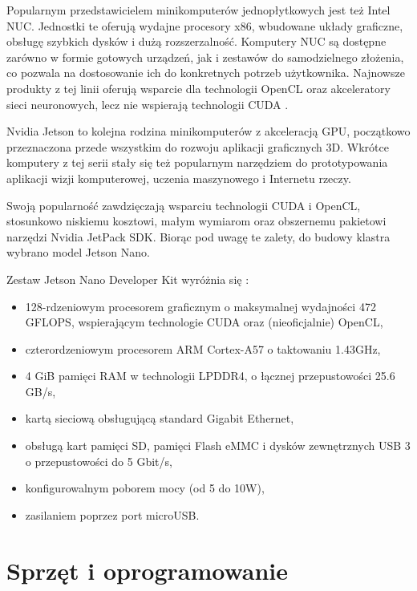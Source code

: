 Popularnym przedstawicielem minikomputerów jednopłytkowych jest też Intel NUC. Jednostki te
oferują wydajne procesory x86, wbudowane układy graficzne, obsługę szybkich dysków i dużą
rozszerzalność. Komputery NUC są dostępne zarówno w formie gotowych urządzeń, jak i zestawów
do samodzielnego złożenia, co pozwala na dostosowanie ich do konkretnych potrzeb użytkownika.
Najnowsze produkty z tej linii oferują wsparcie dla technologii OpenCL oraz akceleratory
sieci neuronowych, lecz nie wspierają technologii CUDA \cite{nuc-list}.

Nvidia Jetson to kolejna rodzina minikomputerów z akceleracją GPU, początkowo przeznaczona
przede wszystkim do rozwoju aplikacji graficznych 3D. Wkrótce komputery z tej serii stały
się też popularnym narzędziem do prototypowania aplikacji wizji komputerowej, uczenia
maszynowego i Internetu rzeczy.

Swoją popularność zawdzięczają wsparciu technologii CUDA i OpenCL, stosunkowo niskiemu
kosztowi, małym wymiarom oraz obszernemu pakietowi narzędzi Nvidia JetPack SDK.
Biorąc pod uwagę te zalety, do budowy klastra wybrano model Jetson Nano.

Zestaw Jetson Nano Developer Kit wyróżnia się \cite{jetson-spec}:
\begin{itemize}
	\item 128-rdzeniowym procesorem graficznym o maksymalnej wydajności 472 GFLOPS,
	      wspierającym technologie CUDA oraz (nieoficjalnie) OpenCL,
	\item czterordzeniowym procesorem ARM Cortex-A57 o taktowaniu 1.43GHz,
	\item 4 GiB pamięci RAM w technologii LPDDR4, o łącznej przepustowości 25.6 GB/s,
	\item kartą sieciową obsługującą standard Gigabit Ethernet,
	\item obsługą kart pamięci SD, pamięci Flash eMMC i dysków zewnętrznych USB 3 o przepustowości do 5 Gbit/s,
	\item konfigurowalnym poborem mocy (od 5 do 10W),
	\item zasilaniem poprzez port microUSB.
\end{itemize}

\section{Sprzęt i oprogramowanie}

